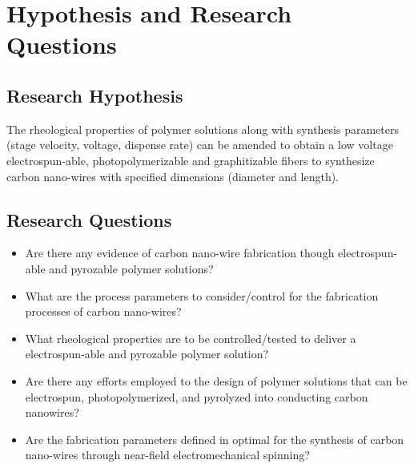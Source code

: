 
\chapter{Hypothesis and Research Questions} %

\label{Chapter:HypothesisandResearchQuestions}

\section{Research Hypothesis}

The rheological properties of polymer solutions along with synthesis parameters (stage velocity, voltage, dispense rate) can be amended to obtain a low voltage electrospun-able, photopolymerizable and graphitizable fibers to synthesize carbon nano-wires with specified dimensions (diameter and length).

\section{Research Questions}

\begin{itemize}
	\item{
	Are there any evidence of carbon nano-wire fabrication though electrospun-able and pyrozable polymer solutions?
	}
	\item{
	What are the process parameters to consider/control for the fabrication processes of carbon nano-wires? 
	}
	\item{
	What rheological properties are to be controlled/tested to deliver a electrospun-able and pyrozable polymer solution?	
	}
	\item{
	Are there any efforts employed to the design of polymer solutions that can be electrospun, photopolymerized, and pyrolyzed into conducting carbon nanowires?
	}
	\item{
	Are the fabrication parameters defined in \cite{Cardenas2017} optimal for the synthesis of carbon nano-wires through near-field electromechanical spinning?	
	}
\end{itemize}





